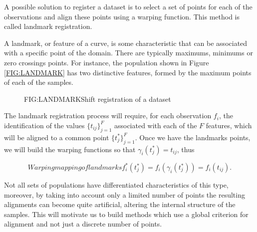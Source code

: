 A possible solution to register a dataset is to select a set of points for each
of the observations and align these points using a warping function. This method
 is called landmark registration.

A landmark, or feature of a curve, is some characteristic that can be
associated with a specific point of the domain. There are typically maximums, minimums or
zero crossings points. For instance, the population shown in Figure
\ref{FIG:LANDMARK} has two distinctive features, formed by the maximum points of
 each of the samples.


\begin{figure}[Shift registration of a dataset]{FIG:LANDMARK}{Shift registration of a dataset}
   \quad
\end{figure}


The landmark registration process will require, for each observation $f_i$,
the identification of the values $\{t_{ij}\}_{j=1}^{F}$ associated with each of
the $F$ features, which will be aligned to a common point
$\{t_{j}^*\}_{j=1}^{F}$. Once we have the landmarks points, we will build the
 warping functions so that $\gamma_i(t_j^*)=t_{ij}$, thus

\begin{equation}[]{Warping mapping of landmarks}
f_i^*(t_j^*) = f_i(\gamma_i(t_j^*)) = f_i(t_{ij}).
\end{equation}

Not all sets of populations have differentiated characteristics of this type,
moreover, by taking into account only a limited number of points the resulting
alignments can become quite artificial, altering the internal structure of the
samples.
This will motivate us to build methods which use a global criterion for
alignment and not just a discrete number of points.

